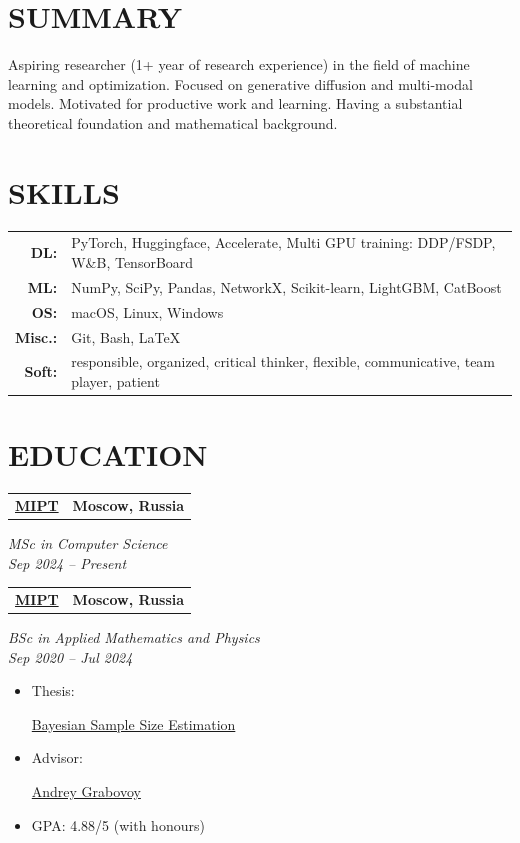 \documentclass[11pt,a4paper]{moderncv}
\newcommand*{\educationentry}[4][0.5mm]{
    \begin{tabularx}{\textwidth}{LR}
        {\bfseries #3} & {\bfseries #4} \\
    \end{tabularx}
    {\itshape #2}
    \par\addvspace{#1}
}
\begin{document}
\hfill
\begin{minipage}[t]{0.35\textwidth}

\section{SUMMARY}
Aspiring researcher (1+ year of research experience) in the field of machine learning and optimization. Focused on generative diffusion and multi-modal models. Motivated for productive work and learning. Having a substantial theoretical foundation and mathematical background.

\section{SKILLS}
\begin{tabularx}{\textwidth}{>{\bfseries}r@{\hskip 3.5mm}L}
DL: & PyTorch, Huggingface, Accelerate, Multi GPU training: DDP/FSDP, W\&B, TensorBoard \\
ML: & NumPy, SciPy, Pandas, NetworkX, Scikit-learn, LightGBM, CatBoost \\
OS: & macOS, Linux, Windows \\
Misc.: & Git, Bash, \LaTeX \\
Soft: & responsible, organized, critical thinker, flexible, communicative, team player, patient
\end{tabularx}

\section{EDUCATION}

\educationentry{MSc in Computer Science\\Sep 2024 -- Present}{\href{https://mipt.ru}{MIPT}}{Moscow, Russia}

\educationentry{BSc in Applied Mathematics and Physics\\Sep 2020 -- Jul 2024}{\href{https://mipt.ru}{MIPT}}{Moscow, Russia}
\begin{itemize}
\item Thesis: \par \href{https://github.com/intsystems/Kiselev-BS-Thesis}{Bayesian Sample Size Estimation}
\item Advisor: \par \href{https://andriygav.github.io}{Andrey Grabovoy}
\item GPA: 4.88/5 (with honours)
\end{itemize}


\end{minipage}
\end{document}
